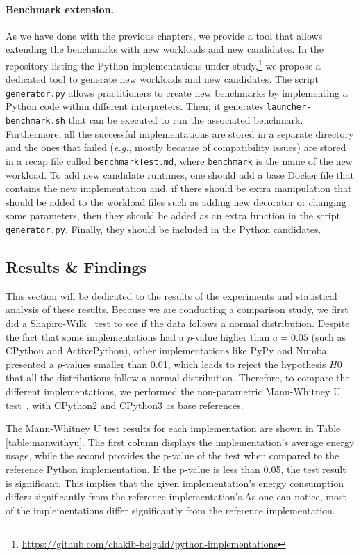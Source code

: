 \paragraph{Benchmark extension.}
As we have done with the previous chapters, we provide a tool that allows extending the benchmarks with new workloads and new candidates.
In the repository listing the Python implementations under study,\footnote{\url{https://github.com/chakib-belgaid/python-implementations}} we propose a dedicated tool to generate new workloads and new candidates.
The script \texttt{generator.py} allows practitioners to create new benchmarks by implementing a Python code within different interpreters.
Then, it generates \texttt{launcher-benchmark.sh} that can be executed to run the associated benchmark.
Furthermore, all the successful implementations are stored in a separate directory and the ones that failed (\emph{e.g.}, mostly because of compatibility issues) are stored in a recap file called \texttt{benchmarkTest.md}, where \texttt{benchmark} is the name of the new workload.
To add new candidate runtimes, one should add a base Docker file that contains the new implementation and, if there should be extra manipulation that should be added to the workload files such as adding new decorator or changing some parameters, then they should be added as an extra function in the script \texttt{generator.py}.
Finally, they should be included in the Python candidates.

\subsection{Results \& Findings}
This section will be dedicated to the results of the experiments and statistical analysis of these results.
Because we are conducting a comparison study, we first did a Shapiro-Wilk~\cite{shapiro1968comparative} test to see if the data follows a normal distribution.
Despite the fact that some implementations had a $p$-value higher than $a=0.05$ (such as CPython and ActivePython), other implementations like PyPy and Numba presented a $p$-values smaller than 0.01, which leads to reject the hypothesis $H0$ that all the distributions follow a normal distribution.
Therefore, to compare the different implementations, we performed the non-parametric Mann-Whitney U test~\cite{zimmerman1987comparative}, with CPython2 and CPython3 as base references.

The Mann-Whitney U test results for each implementation are shown in Table \ref{table:manwithyu}. The first column displays the implementation's average energy usage, while the second provides the p-value of the test when compared to the reference Python implementation. If the p-value is less than 0.05, the test result is significant. This implies that the given implementation's energy consumption differs significantly from the reference implementation's.As one can notice, most of the implementations differ significantly from the reference implementation.


